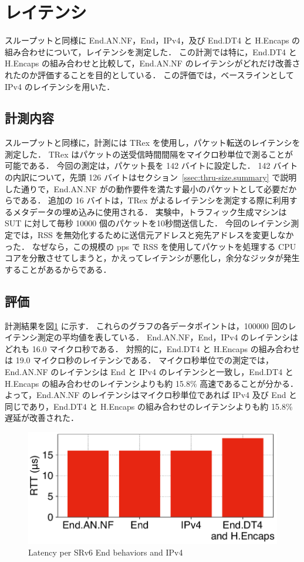 \section{レイテンシ}
\label{sec:eval.rtt}
スループットと同様に End.AN.NF，End，IPv4，及び End.DT4 と H.Encaps の組み合わせについて，レイテンシを測定した．
この計測では特に，End.DT4 と H.Encaps の組み合わせと比較して，End.AN.NF のレイテンシがどれだけ改善されたのか評価することを目的としている．
この評価では，ベースラインとして IPv4 のレイテンシを用いた．

\subsection{計測内容}
\label{ssec:rtt.summary}
スループットと同様に，計測には TRex を使用し，パケット転送のレイテンシを測定した．
TRex はパケットの送受信時間間隔をマイクロ秒単位で測ることが可能である．
今回の測定は，パケット長を 142 バイトに設定した．
142 バイトの内訳について，先頭 126 バイトはセクション~\ref{ssec:thru-size.summary} で説明した通りで，End.AN.NF がの動作要件を満たす最小のパケットとして必要だからである．
追加の 16 バイトは，TRex がよるレイテンシを測定する際に利用するメタデータの埋め込みに使用される．
実験中，トラフィック生成マシンは SUT に対して毎秒 10000 個のパケットを10秒間送信した．
今回のレイテンシ測定では，RSS を無効化するために送信元アドレスと宛先アドレスを変更しなかった．
なぜなら，この規模の pps で RSS を使用してパケットを処理する CPU コアを分散させてしまうと，かえってレイテンシが悪化し，余分なジッタが発生することがあるからである．

\subsection{評価}
\label{ssec:rtt.eval}
計測結果を図\ref{fig:rtt} に示す．
これらのグラフの各データポイントは，100000 回のレイテンシ測定の平均値を表している．
End.AN.NF，End，IPv4 のレイテンシはどれも 16.0 マイクロ秒である．
対照的に，End.DT4 と H.Encaps の組み合わせは 19.0 マイクロ秒のレイテンシである．
マイクロ秒単位での測定では，End.AN.NF のレイテンシは End と IPv4 のレイテンシと一致し，End.DT4 と H.Encaps の組み合わせのレイテンシよりも約 15.8\% 高速であることが分かる．
よって，End.AN.NF のレイテンシはマイクロ秒単位であれば IPv4 及び End と同じであり，End.DT4 と H.Encaps の組み合わせのレイテンシよりも約 15.8\% 遅延が改善された．

\begin{figure}[t]
    \centering
    \includegraphics[width=0.95\linewidth]{img/latency.pdf}
    \caption{Latency per SRv6 End behaviors and IPv4}
    \label{fig:rtt}
\end{figure}